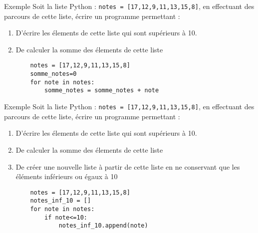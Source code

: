 \documentclass[10pt]{beamer}
\begin{document}
\begin{frame}[fragile]
	\mframe{\Python}
	\begin{exampleblock}{Exemple}
		Soit la liste Python : {\tt notes = [17,12,9,11,13,15,8]}, en effectuant des parcours de cette liste, écrire un programme permettant :
		\begin{enumerate}[label=\textbullet]
			\item D'écrire les élements de cette liste qui sont supérieurs à 10.
			\item De calculer la somme des élements de cette liste
			      \begin{lstlisting}
	notes = [17,12,9,11,13,15,8]
	somme_notes=0
	for note in notes:
		somme_notes = somme_notes + note
\end{lstlisting}
		\end{enumerate}
	\end{exampleblock}
\end{frame}

\begin{frame}[fragile]
	\mframe{\Python}
	\begin{exampleblock}{Exemple}
		Soit la liste Python : {\tt notes = [17,12,9,11,13,15,8]}, en effectuant des parcours de cette liste, écrire un programme permettant :
		\begin{enumerate}[label=\textbullet]
			\item D'écrire les élements de cette liste qui sont supérieurs à 10.
			\item De calculer la somme des élements de cette liste
			\item De créer une nouvelle liste à partir de cette liste en ne conservant que les éléments inférieurs ou égaux à 10
			      \begin{lstlisting}
	notes = [17,12,9,11,13,15,8]
	notes_inf_10 = []
	for note in notes:
		if note<=10:
			notes_inf_10.append(note)
\end{lstlisting}
		\end{enumerate}
	\end{exampleblock}
\end{frame}
\end{document}
